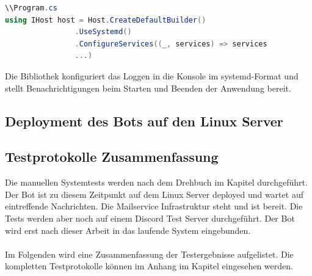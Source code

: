 \documentclass[a4paper, table]{article}
\begin{document}
\begin{lstlisting}[language=csharp]
\\Program.cs
using IHost host = Host.CreateDefaultBuilder()
                .UseSystemd()
                .ConfigureServices((_, services) => services
                ...)
\end{lstlisting}

Die Bibliothek konfiguriert das Loggen in die Konsole im systemd-Format und stellt Benachrichtigungen beim Starten und Beenden der Anwendung bereit.

\newpage
\subsection{Deployment des Bots auf den Linux Server}


\newpage
\subsection{Testprotokolle Zusammenfassung}
Die manuellen Systemtests werden nach dem Drehbuch im Kapitel  durchgeführt.
Der Bot ist zu diesem Zeitpunkt auf dem Linux Server deployed und wartet auf eintreffende Nachrichten. 
Die Mailservice Infrastruktur steht und ist bereit. 
Die Tests werden aber noch auf einem Discord Test Server durchgeführt. 
Der Bot wird erst nach dieser Arbeit in das laufende System eingebunden.\\\\
Im Folgenden wird eine Zusammenfassung der Testergebnisse aufgelistet. 
Die kompletten Testprotokolle können im Anhang im Kapitel  eingesehen werden.
\end{document}

